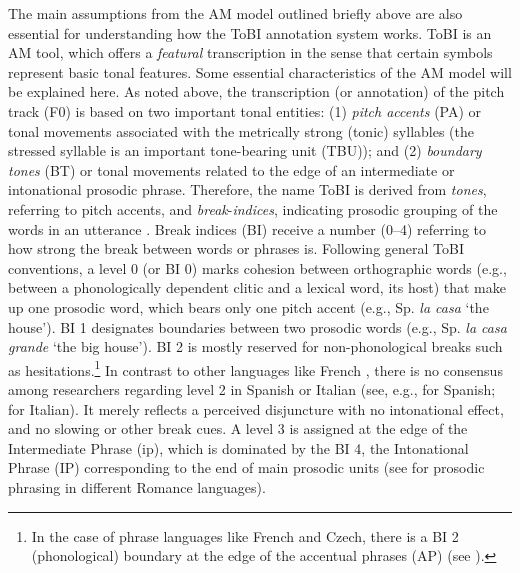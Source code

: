 The main assumptions from the AM model outlined briefly above are also essential for understanding how the ToBI annotation system works. ToBI is an AM tool, which offers a \textit{featural} transcription in the sense that certain symbols represent basic tonal features. Some essential characteristics of the AM model will be explained here. As noted above, the transcription (or annotation) of the pitch track (F0) is based on two important tonal entities: (1) \textit{pitch accents} (PA) or tonal movements associated with the metrically strong (tonic) syllables (the stressed syllable is an important tone-bearing unit (TBU)); and (2) \textit{boundary tones} (BT) or tonal movements related to the edge of an intermediate or intonational prosodic phrase. Therefore, the name ToBI is derived from \textit{tones}, referring to pitch accents, and \textit{break}{}-\textit{indices}, indicating prosodic grouping of the words in an utterance \citep{PriceEtAl1991}. Break indices (BI) receive a number (0--4) referring to how strong the break between words or phrases is. Following general ToBI conventions, a level 0 (or BI 0) marks cohesion between orthographic words (e.g., between a phonologically dependent clitic and a lexical word, its host) that make up one prosodic word, which bears only one pitch accent (e.g., Sp. \textit{la casa} ‘the house’). BI 1 designates boundaries between two prosodic words (e.g., Sp. \textit{la casa grande} ‘the big house’). BI 2 is mostly reserved for non-phonological breaks such as hesitations.\footnote{In the case of phrase languages like French and Czech, there is a BI 2 (phonological) boundary at the edge of the accentual phrases (AP) (see ).} In contrast to other languages like French \citep{Delais-RoussarieEtAl2015}, there is no consensus among researchers regarding level 2 in Spanish or Italian (see, e.g., \citealt{HualdePrieto2015} for Spanish;  \citealt{GiliFivelaEtAl2015} for Italian). It merely reflects a perceived disjuncture with no intonational effect, and no slowing or other break cues. A level 3 is assigned at the edge of the Intermediate Phrase (ip), which is dominated by the BI 4, the Intonational Phrase (IP) corresponding to the end of main prosodic units (see \citealt{FrotaEtAl2007} for prosodic phrasing in different Romance languages).


